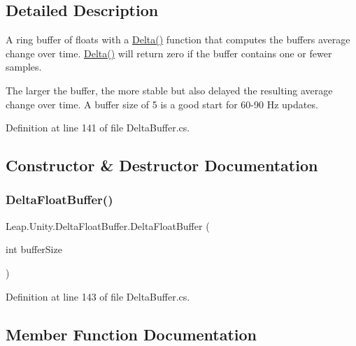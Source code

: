 \subsection{Detailed Description}
A ring buffer of floats with a \mbox{\hyperlink{class_leap_1_1_unity_1_1_delta_float_buffer_afc1e79b97babd5397852a33e3aa425a7}{Delta()}} function that computes the buffer\textquotesingle{}s average change over time. \mbox{\hyperlink{class_leap_1_1_unity_1_1_delta_float_buffer_afc1e79b97babd5397852a33e3aa425a7}{Delta()}} will return zero if the buffer contains one or fewer samples. 

The larger the buffer, the more stable but also delayed the resulting average change over time. A buffer size of 5 is a good start for 60-\/90 Hz updates. 

Definition at line 141 of file Delta\+Buffer.\+cs.



\subsection{Constructor \& Destructor Documentation}
\mbox{\label{class_leap_1_1_unity_1_1_delta_float_buffer_a496dfd0f1489077ae0b34730577c7024}} 
\subsubsection{\texorpdfstring{DeltaFloatBuffer()}{DeltaFloatBuffer()}}
{\footnotesize\ttfamily Leap.\+Unity.\+Delta\+Float\+Buffer.\+Delta\+Float\+Buffer (\begin{DoxyParamCaption}\item[{int}]{buffer\+Size }\end{DoxyParamCaption})}



Definition at line 143 of file Delta\+Buffer.\+cs.



\subsection{Member Function Documentation}
\mbox{\label{class_leap_1_1_unity_1_1_delta_float_buffer_afc1e79b97babd5397852a33e3aa425a7}} 
